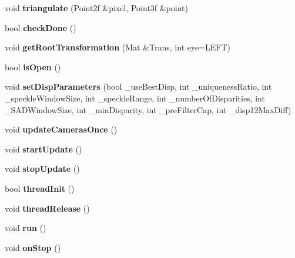 \begin{DoxyCompactItemize}
\item 
void {\bfseries triangulate} (Point2f \&pixel, Point3f \&point)\label{classDisparityThread_a9f132e68856b56d0dded0f1435d1f34c}

\item 
bool {\bfseries check\+Done} ()\label{classDisparityThread_ac4e45d17e21d68002ed8a3a979e7abab}

\item 
void {\bfseries get\+Root\+Transformation} (Mat \&Trans, int eye=L\+E\+FT)\label{classDisparityThread_a9300dc8b230296501c99032633daa0dc}

\item 
bool {\bfseries is\+Open} ()\label{classDisparityThread_af6afa37af0ff8dced127c760c016fe74}

\item 
void {\bfseries set\+Disp\+Parameters} (bool \+\_\+use\+Best\+Disp, int \+\_\+uniqueness\+Ratio, int \+\_\+speckle\+Window\+Size, int \+\_\+speckle\+Range, int \+\_\+number\+Of\+Disparities, int \+\_\+\+S\+A\+D\+Window\+Size, int \+\_\+min\+Disparity, int \+\_\+pre\+Filter\+Cap, int \+\_\+disp12\+Max\+Diff)\label{classDisparityThread_a7c03f103346967e4fe23c315a1ad2f95}

\item 
void {\bfseries update\+Cameras\+Once} ()\label{classDisparityThread_afcfe2413bbbb52bd2e5737197f8c12b1}

\item 
void {\bfseries start\+Update} ()\label{classDisparityThread_a2b80cd97a2bd3f530afdb8615577c2c3}

\item 
void {\bfseries stop\+Update} ()\label{classDisparityThread_a17f750f7e13366abb05f02ca0310ab91}

\item 
bool {\bfseries thread\+Init} ()\label{classDisparityThread_a741ecfd39ec8b949997e38ab31e5908e}

\item 
void {\bfseries thread\+Release} ()\label{classDisparityThread_a29bde42a3bfc24ff666e756febc42334}

\item 
void {\bfseries run} ()\label{classDisparityThread_a88e71e25e8170fe009933cde0c494fca}

\item 
void {\bfseries on\+Stop} ()\label{classDisparityThread_ad354c6f6ee5caba36aea07f66ffbc030}

\end{DoxyCompactItemize}


